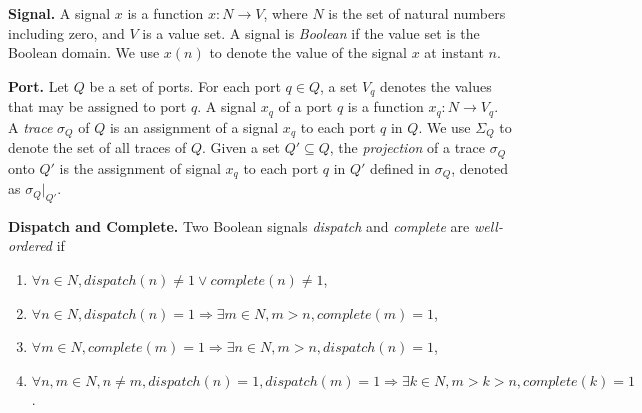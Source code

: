 {\bf Signal.}
A signal $x$ is a function $x: N \rightarrow V$, where $N$ is the set of natural numbers including zero, and $V$ is a value set. 
A signal is \emph{Boolean} if the value set is the Boolean domain.
We use $x(n)$ to denote the value of the signal $x$ at instant $n$. 

{\bf Port.}
Let $Q$  be a set of ports. 
For each port $q \in Q$, a set $V_q$ denotes the values that may be assigned to port $q$. %
A signal $x_q$ of a port $q$ is a function $x_q: N \rightarrow V_q$.
A \emph{trace} $\sigma_Q$ of $Q$ is an assignment of a signal $x_q$ to each port $q$ in $Q$.
We use $\Sigma_Q$ to denote the set of all traces of $Q$.
Given a set $Q' \subseteq Q$, the \emph{projection} of a trace $\sigma_Q$ onto $Q'$ is the assignment of signal $x_q$ to each port $q$ in $Q'$ defined in $\sigma_Q$, denoted as $\sigma_Q|_{Q'}$.   
 
{\bf Dispatch and Complete.}
Two Boolean signals \emph{dispatch} and \emph{complete} are \emph{well-ordered} if 

\begin{enumerate}
	\item $\forall n \in N, dispatch(n) \ne 1 \vee complete(n) \ne 1 $,
	\item $ \forall n\in N, dispatch(n) = 1 \Rightarrow \exists m\in N, m > n, complete(m) =  1 $,
	\item $ \forall m\in N, complete(m) = 1 \Rightarrow \exists n\in N, m > n, dispatch(n) =  1 $,
	\item $ \forall n,m\in N, n \neq m, dispatch(n) = 1, dispatch(m) = 1 \Rightarrow \exists k\in N, m >k> n, complete(k) = 1 $.
\end{enumerate}

